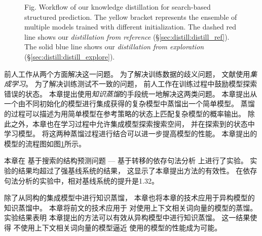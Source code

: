 \begin{figure}[t]
	{Fig. $\!$}{Workflow of our knowledge distillation for search-based
		structured prediction. The yellow bracket represents the ensemble
		of multiple models trained with different initialization. 
		The dashed red line shows our {\it distillation from reference} (\S\ref{sec:distill:distill_ref}).
		The solid blue line shows our {\it distillation from exploration} (\S\ref{sec:distill:distill_explore}).\label{fig:distill:workflow}}
\end{figure}

前人工作从两个方面解决这一问题。
为了解决训练数据的歧义问题，
文献使用\textit{集成学习}。
为了解决训练测试不一致的问题，
前人工作\cite{
	pmlr-v9-ross10a,
	pmlr-v15-ross11a,
	goldberg-nivre:2012:PAPERS,
	NIPS2015_5956,
	goodman-vlachos-naradowsky:2016:P16-1}在训练过程中鼓励模型探索错误的状态。
本章提出使用\textit{知识蒸馏}\cite{DBLP:journals/corr/HintonVD15}的手段统一地解决这两类问题。
本章提出从一个由不同初始化的模型进行集成获得的复杂模型中蒸馏出一个简单模型。
蒸馏的过程可以描述为用简单模型在参考策略的状态上匹配复杂模型的概率输出。
除此之外，本章也在学习过程中允许集成模型探索搜索空间，
并在探索到的状态中学习模型。
将这两种蒸馏过程进行结合可以进一步提高模型的性能。
本章提出的模型的流程图如图\ref{fig:distill:workflow}所示。

本章在
基于搜索的结构预测问题 --- 基于转移的依存句法分析
上进行了实验。
实验的结果均超过了强基线系统的结果，
这显示了本章提出方法的有效性。
在依存句法分析的实验中，相对基线系统的提升是1.32。%

除了从同构的集成模型中进行知识蒸馏，
本章也将本章的技术应用于异构模型的知识蒸馏中。
本章将前文的技术应用于
对使用上下文相关词向量的模型的蒸馏。
实验结果表明
本章提出的方法可以有效从异构模型中进行知识蒸馏。
这一结果使得
不使用上下文相关词向量的模型逼近
使用的模型的性能成为可能。


